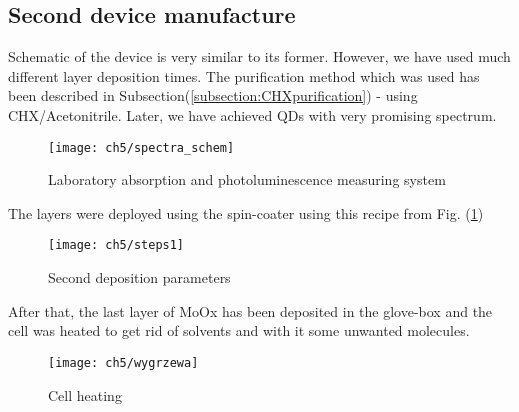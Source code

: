 \subsection{Second device manufacture}

Schematic of the device is very similar to its former. However, we have used much different layer deposition times. The purification method which was used has been described in Subsection(\ref{subsection:CHXpurification}) - using CHX/Acetonitrile. Later, we have achieved QDs with very promising spectrum.

\begin{figure}
\centering
\texttt{[image: ch5/spectra\_schem]}
\caption{Laboratory absorption and photoluminescence measuring system }
\end{figure}

The layers were deployed using the spin-coater using this recipe from Fig. (\ref{fig:steps1})

\begin{figure}[H]
\centering
\texttt{[image: ch5/steps1]}
\caption{Second deposition parameters}
\label{fig:steps1}
\end{figure}

After that, the last layer of MoOx has been deposited in the glove-box and the cell was heated to get rid of solvents and with it some unwanted molecules. 

\begin{figure}
\centering
\texttt{[image: ch5/wygrzewa]}
\caption{Cell heating}
\end{figure}

